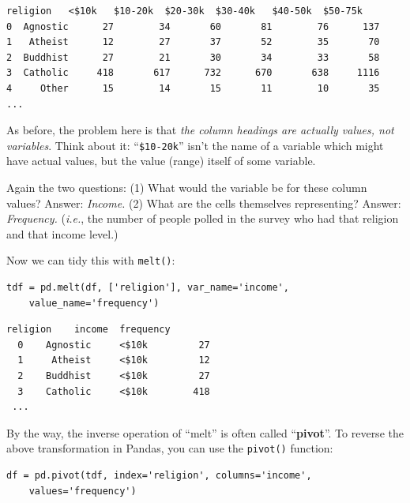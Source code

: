 \small
\begin{Verbatim}[fontsize=\footnotesize,samepage=true,frame=none]
   religion   <$10k   $10-20k  $20-30k  $30-40k   $40-50k  $50-75k
0  Agnostic      27        34       60       81        76      137
1   Atheist      12        27       37       52        35       70
2  Buddhist      27        21       30       34        33       58
3  Catholic     418       617      732      670       638     1116
4     Other      15        14       15       11        10       35
...
\end{Verbatim}
\normalsize

As before, the problem here is that \textit{the column headings are actually
values, not variables}. Think about it: ``\texttt{\$10-20k}'' isn't the name of
a variable which might have actual values, but the value (range) itself of some
variable.

Again the two questions: (1) What would the variable be for these column
values? Answer: \textit{Income.} (2) What are the cells themselves
representing? Answer: \textit{Frequency.} (\textit{i.e.}, the number of people
polled in the survey who had that religion and that income level.)

Now we can tidy this with \texttt{melt()}:

\begin{Verbatim}[fontsize=\footnotesize,samepage=true,frame=single,framesep=3mm]
tdf = pd.melt(df, ['religion'], var_name='income',
    value_name='frequency')
\end{Verbatim}
\vspace{-.2in}

\begin{Verbatim}[fontsize=\small,samepage=true,frame=leftline,framesep=5mm,framerule=1mm]
       religion    income  frequency
  0    Agnostic     <$10k         27
  1     Atheist     <$10k         12
  2    Buddhist     <$10k         27
  3    Catholic     <$10k        418
 ...
\end{Verbatim}


By the way, the inverse operation of ``melt'' is often called
``\textbf{pivot}''. To reverse the above transformation in Pandas, you can use
the \texttt{pivot()} function:

\begin{Verbatim}[fontsize=\footnotesize,samepage=true,frame=single,framesep=3mm]
df = pd.pivot(tdf, index='religion', columns='income',
    values='frequency')
\end{Verbatim}

